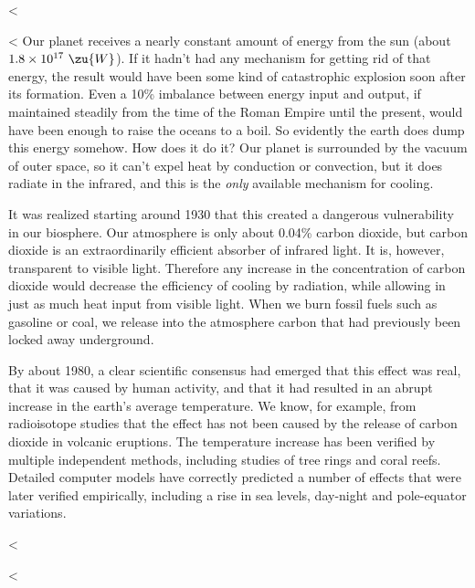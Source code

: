 <%

<%
Our planet receives a nearly constant amount of energy from the sun (about $1.8\times10^{17}\ \zu{W}$).
If it hadn't had any mechanism for getting rid of that energy, the result would have been some kind of catastrophic explosion
soon after its formation. Even a 10\% imbalance between energy input and output, if maintained steadily from the time
of the Roman Empire until the present, would have been enough to raise the oceans to a boil.
So evidently the earth does dump this energy somehow. How does it do it?
Our planet is surrounded by the vacuum of outer space, so it can't expel heat by conduction or convection, but
it does radiate in the infrared, and this is the \emph{only} available mechanism for cooling.


It was realized starting around 1930 that this created a dangerous vulnerability in our biosphere.
Our atmosphere is only about 0.04\% carbon dioxide, but carbon dioxide is an extraordinarily efficient
absorber of infrared light. It is, however, transparent to visible light. Therefore any increase
in the concentration of carbon dioxide would decrease the efficiency of cooling by radiation, while
allowing in just as much heat input from visible light. When we burn fossil fuels such as gasoline
or coal, we release into the atmosphere carbon that had previously been locked away underground.

By about 1980, a clear scientific consensus had emerged that this effect was real, that it was
caused by human activity, and that it had resulted in an abrupt increase in the earth's
average temperature. We know, for example,  from radioisotope studies that the effect has not been caused by the release of
carbon dioxide in volcanic eruptions. The temperature increase has been verified by multiple independent
methods, including studies of tree rings and coral reefs. Detailed computer models have correctly
predicted a number of effects that were later verified empirically, including a rise in sea levels,
day-night and pole-equator variations.


<%

<%
